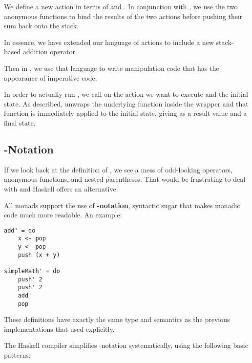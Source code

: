 \begin{notelist}
    \item We define a new action  in terms of  and . In conjunction with \code{(>>=)},
          we use the two anonymous functions to bind the results of the two  actions before pushing their sum
          back onto the stack.
    \item In essence, we have extended our language of  actions to include a new stack-based addition operator.
    \item Then in , we use that language to write  manipulation code that has the appearance of
          imperative code. 
\end{notelist}

In order to actually run , we call  on the action we want to execute and the initial state.
As described,  unwraps the underlying function inside the  wrapper and that function is immediately
applied to the initial state, giving as a result value and a final state.

\subsection{-Notation}

If we look back at the definition of , we see a mess of odd-looking operators, anonymous functions, and nested
parentheses. That would be frustrating to deal with and Haskell offers an alternative.

All monads support the use of \textbf{-notation}, syntactic sugar that makes monadic code much more readable.
An example:

\begin{lstlisting}
add' = do
    x <- pop
    y <- pop
    push (x + y)

simpleMath' = do
    push' 2
    push' 2
    add'
    pop
\end{lstlisting}

These definitions have exactly the same type and semantics as the previous implementations that used \code{(>>=)} explicitly.

The Haskell compiler simplifies -notation systematically, using the following basic patterns:
 

